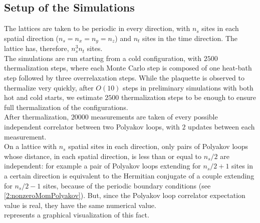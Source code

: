 \subsection{Setup of the Simulations}
The lattices are taken to be periodic in every direction, with $n_s$ sites in each spatial direction ($n_s=n_x=n_y=n_z$) and $n_t$ sites in the time direction.
The lattice has, therefore, $n_s^3n_t$ sites.\\
The simulations are run starting from a cold configuration, with $2500$ thermalization steps, where each Monte Carlo step is composed of one heat-bath step followed by three overrelaxation steps.
While the plaquette is observed to thermalize very quickly, after $O(10)$ steps in preliminary simulations with both hot and cold starts, we estimate $2500$ thermalization steps to be enough to ensure full thermalization of the configurations.\\
After thermalization, $20000$ measurements are taken of every possible independent correlator between two Polyakov loops, with $2$ updates between each measurement.\\
On a lattice with $n_s$ spatial sites in each direction, only pairs of Polyakov loops whose distance, in each spatial direction, is less than or equal to $n_s/2$ are independent: for example a pair of Polyakov loops extending for $n_s/2+1$ sites in a certain direction is equivalent to the Hermitian conjugate of a couple extending for $n_s/2-1$ sites, because of the periodic boundary conditions (see \eqref{2:nonzeroMomPolyakov}).
But, since the Polyakov loop correlator expectation value is real, they have the same numerical value.\\
 represents a graphical visualization of this fact.
